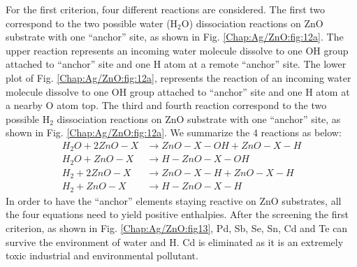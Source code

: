 For the first criterion, four different reactions are considered. The first two correspond to the two possible water ($\text{H}_{\text{2}}\text{O}$) dissociation reactions on ZnO substrate with one ``anchor'' site, as shown in Fig. \ref{Chap:Ag/ZnO:fig:12a}. The upper reaction represents an incoming water molecule dissolve to one OH group attached to ``anchor'' site and one H atom at a remote ``anchor'' site. The lower plot of Fig. \ref{Chap:Ag/ZnO:fig:12a}, represents the reaction of an incoming water molecule dissolve to one OH group attached to ``anchor'' site and one H atom at a nearby O atom top. The third and fourth reaction correspond to the two possible $\text{H}_{\text{2}}$ dissociation reactions on ZnO substrate with one ``anchor'' site, as shown in Fig. \ref{Chap:Ag/ZnO:fig:12a}. We summarize the 4 reactions as below:
\begin{subequations}
\begin{align}
H_2O + 2 ZnO-X & \rightarrow ZnO-X-OH + ZnO-X-H
 \label{Chap:Ag/ZnO:eq:anchor1}\\
H_2O + ZnO-X & \rightarrow H-ZnO-X-OH
 \label{Chap:Ag/ZnO:eq:anchor2}\\
H_2 + 2 ZnO-X & \rightarrow ZnO-X-H + ZnO-X-H
 \label{Chap:Ag/ZnO:eq:anchor3}\\
H_2 + ZnO-X & \rightarrow H-ZnO-X-H
 \label{Chap:Ag/ZnO:eq:anchor4}
\end{align}
\end{subequations}
In order to have the ``anchor'' elements staying reactive on ZnO substrates, all the four equations need to yield positive enthalpies. After the screening the first criterion, as shown in Fig. \ref{Chap:Ag/ZnO:fig13}, Pd, Sb, Se, Sn, Cd and Te can survive the environment of water and H. Cd is eliminated as it is an extremely toxic industrial and environmental pollutant. 

